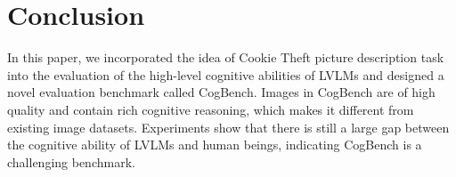 \section{Conclusion}

In this paper, we incorporated the idea of Cookie Theft picture description task into the evaluation of the high-level cognitive abilities of LVLMs and designed a novel evaluation benchmark called CogBench.
Images in CogBench are of high quality and contain rich cognitive reasoning, which makes it different from existing image datasets.
Experiments show that there is still a large gap between the cognitive ability of LVLMs and human beings, indicating CogBench is a challenging benchmark.
